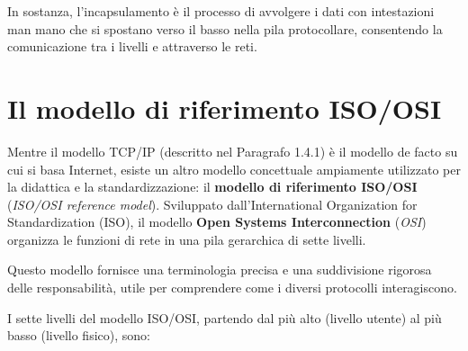 In sostanza, l'incapsulamento è il processo di avvolgere i dati con intestazioni man mano che si spostano verso il basso nella pila protocollare, consentendo la comunicazione tra i livelli e attraverso le reti. 

\section{Il modello di riferimento ISO/OSI}

Mentre il modello TCP/IP (descritto nel Paragrafo 1.4.1) è il modello de facto su cui si basa Internet, esiste un altro modello concettuale ampiamente utilizzato per la didattica e la standardizzazione: il \textbf{modello di riferimento ISO/OSI} (\textit{ISO/OSI reference model}). Sviluppato dall'International Organization for Standardization (ISO), il modello \textbf{Open Systems Interconnection} (\textit{OSI}) organizza le funzioni di rete in una pila gerarchica di sette livelli.

Questo modello fornisce una terminologia precisa e una suddivisione rigorosa delle responsabilità, utile per comprendere come i diversi protocolli interagiscono.

I sette livelli del modello ISO/OSI, partendo dal più alto (livello utente) al più basso (livello fisico), sono:

